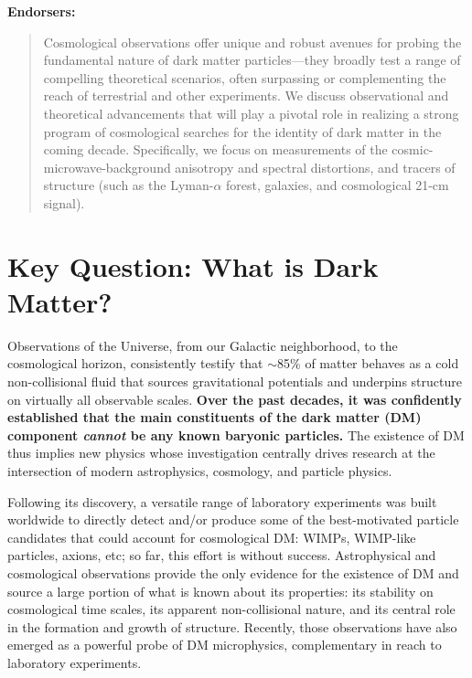 \documentclass[12pt]{article}
\begin{document}
\noindent\textbf{Endorsers:\texttt{}}
\begin{abstract}
Cosmological observations offer unique and robust avenues for probing the fundamental nature of dark matter particles---they broadly test a range of compelling theoretical scenarios, often surpassing or complementing the reach of terrestrial and other experiments.
We discuss observational and theoretical advancements that will play a pivotal role in realizing a strong program of cosmological searches for the identity of dark matter in the coming decade. Specifically, we focus on measurements of the cosmic-microwave-background anisotropy and spectral distortions, and tracers of structure (such as the Lyman-$\alpha$ forest, galaxies, and cosmological 21-cm signal).
\end{abstract}

\pagebreak
\section{Key Question: What is Dark Matter?}
 
Observations of the Universe, from our Galactic neighborhood, to the cosmological horizon, consistently testify that $\sim$85$\%$ of matter behaves as a cold non-collisional fluid that sources gravitational potentials and underpins structure on virtually all observable scales.
\textbf{Over the past decades, it was confidently established that the main constituents of the dark matter (DM) component \textit{cannot} be any known baryonic particles.}
The existence of DM thus implies new physics whose investigation centrally drives research at the intersection of modern astrophysics, cosmology, and particle physics. 

Following its discovery, a versatile range of laboratory experiments was built worldwide to directly detect and/or produce some of the best-motivated particle candidates that could account for cosmological DM: WIMPs, WIMP-like particles, axions, etc; so far, this effort is without success.
Astrophysical and cosmological observations provide the only evidence for the existence of DM and source a large portion of what is known about its properties: its stability on cosmological time scales, its apparent non-collisional nature, and its central role in the formation and growth of structure.
Recently, those observations have also emerged as a powerful probe of DM microphysics, complementary in reach to laboratory experiments.
\end{document}
